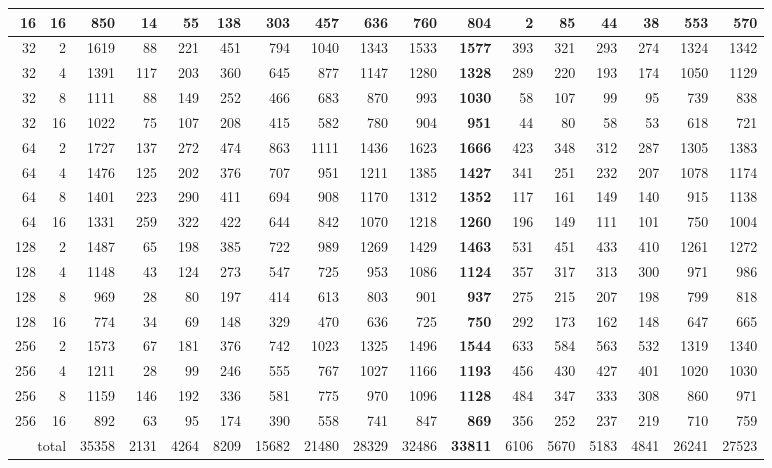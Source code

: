 \begin{table}[t]
\begin{tabular}{rr r rrrrrrrrrrrrrr}
16 & 16 & 850 & 14 & 55 & 138 & 303 & 457 & 636 & 760 & \textbf{804} & 2 & 85 & 44 & 38 & 553 & 570 \\
\midrule
32 & 2 & 1619 & 88 & 221 & 451 & 794 & 1040 & 1343 & 1533 & \textbf{1577} & 393 & 321 & 293 & 274 & 1324 & 1342 \\
32 & 4 & 1391 & 117 & 203 & 360 & 645 & 877 & 1147 & 1280 & \textbf{1328} & 289 & 220 & 193 & 174 & 1050 & 1129 \\
32 & 8 & 1111 & 88 & 149 & 252 & 466 & 683 & 870 & 993 & \textbf{1030} & 58 & 107 & 99 & 95 & 739 & 838 \\
32 & 16 & 1022 & 75 & 107 & 208 & 415 & 582 & 780 & 904 & \textbf{951} & 44 & 80 & 58 & 53 & 618 & 721 \\
\midrule
64 & 2 & 1727 & 137 & 272 & 474 & 863 & 1111 & 1436 & 1623 & \textbf{1666} & 423 & 348 & 312 & 287 & 1305 & 1383 \\
64 & 4 & 1476 & 125 & 202 & 376 & 707 & 951 & 1211 & 1385 & \textbf{1427} & 341 & 251 & 232 & 207 & 1078 & 1174 \\
64 & 8 & 1401 & 223 & 290 & 411 & 694 & 908 & 1170 & 1312 & \textbf{1352} & 117 & 161 & 149 & 140 & 915 & 1138 \\
64 & 16 & 1331 & 259 & 322 & 422 & 644 & 842 & 1070 & 1218 & \textbf{1260} & 196 & 149 & 111 & 101 & 750 & 1004 \\
\midrule
128 & 2 & 1487 & 65 & 198 & 385 & 722 & 989 & 1269 & 1429 & \textbf{1463} & 531 & 451 & 433 & 410 & 1261 & 1272 \\
128 & 4 & 1148 & 43 & 124 & 273 & 547 & 725 & 953 & 1086 & \textbf{1124} & 357 & 317 & 313 & 300 & 971 & 986 \\
128 & 8 & 969 & 28 & 80 & 197 & 414 & 613 & 803 & 901 & \textbf{937} & 275 & 215 & 207 & 198 & 799 & 818 \\
128 & 16 & 774 & 34 & 69 & 148 & 329 & 470 & 636 & 725 & \textbf{750} & 292 & 173 & 162 & 148 & 647 & 665 \\
\midrule
256 & 2 & 1573 & 67 & 181 & 376 & 742 & 1023 & 1325 & 1496 & \textbf{1544} & 633 & 584 & 563 & 532 & 1319 & 1340 \\
256 & 4 & 1211 & 28 & 99 & 246 & 555 & 767 & 1027 & 1166 & \textbf{1193} & 456 & 430 & 427 & 401 & 1020 & 1030 \\
256 & 8 & 1159 & 146 & 192 & 336 & 581 & 775 & 970 & 1096 & \textbf{1128} & 484 & 347 & 333 & 308 & 860 & 971 \\
256 & 16 & 892 & 63 & 95 & 174 & 390 & 558 & 741 & 847 & \textbf{869} & 356 & 252 & 237 & 219 & 710 & 759 \\
\midrule
\multicolumn{2}{r}{total} & 35358 & 2131 & 4264 & 8209 & 15682 & 21480 & 28329 & 32486 & \textbf{33811} & 6106 & 5670 & 5183 & 4841 & 26241 & 27523 \\
\bottomrule
\end{tabular}
\end{table}
